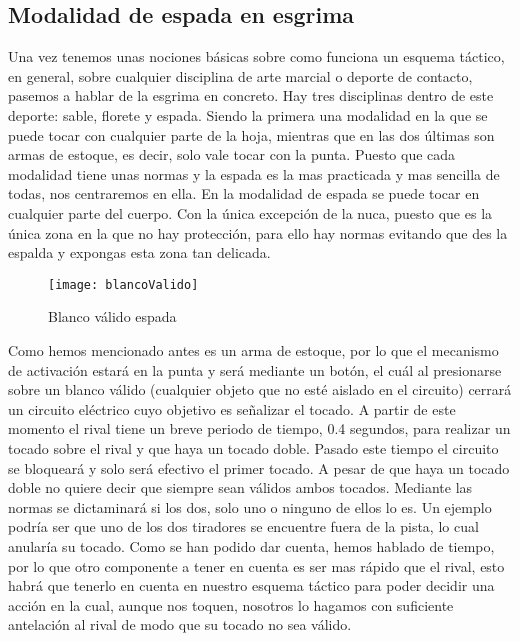 \subsection{Modalidad de espada en esgrima}

Una vez tenemos unas nociones básicas sobre como funciona un esquema táctico, en general, sobre cualquier
 disciplina de arte marcial o deporte de contacto, pasemos a hablar de la esgrima en concreto.
 Hay tres disciplinas dentro de este deporte: sable, florete y espada. Siendo la primera una modalidad
 en la que se puede tocar con cualquier parte de la hoja, mientras que en las dos últimas son armas de
 estoque, es decir, solo vale tocar con la punta. Puesto que cada modalidad tiene unas normas y la espada
 es la mas practicada y mas sencilla de todas, nos centraremos en ella. En la modalidad de espada se puede
 tocar en cualquier parte del cuerpo. Con la única excepción de la nuca, puesto que es la única
 zona en la que no hay protección, para ello hay normas evitando que des la espalda y expongas esta zona
 tan delicada.

\begin{figure}[htb]
	\centering
	\texttt{[image: blancoValido]}
	\caption[Blanco válido espada]{Blanco válido espada}
	\label{fig:blancoValido}
\end{figure}


Como hemos mencionado antes es un arma de estoque, por lo que el mecanismo de activación estará en la punta
 y será mediante un botón, el cuál al presionarse sobre un blanco válido (cualquier objeto que no esté aislado en el circuito)
 cerrará un circuito eléctrico cuyo objetivo es señalizar el tocado. A partir de este
 momento el rival tiene un breve periodo de tiempo, 0.4 segundos,
 para realizar un tocado sobre el rival y que haya un tocado doble. Pasado este tiempo el circuito se bloqueará
 y solo será efectivo el primer tocado. A pesar de que haya un tocado doble no quiere decir que siempre sean válidos
 ambos tocados. Mediante las normas se dictaminará si los dos, solo uno o ninguno de ellos lo es.
 Un ejemplo podría ser que uno de los dos tiradores se encuentre fuera de la pista, lo cual anularía su tocado.
 Como se han podido dar cuenta, hemos hablado de tiempo, por lo que otro componente a tener en cuenta es ser mas
 rápido que el rival, esto habrá que tenerlo en cuenta en nuestro esquema táctico para poder decidir una acción en
 la cual, aunque nos toquen, nosotros lo hagamos con suficiente antelación al rival de modo que su tocado no
 sea válido.

